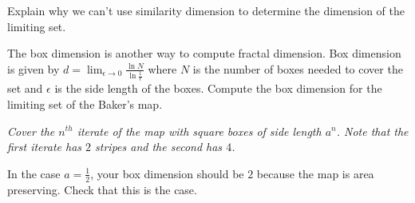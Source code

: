 \documentclass[12pt,letterpaper,noanswers]{exam}
\begin{document}
\begin{questions}
\begin{parts}
\item Explain why we can't use similarity dimension to determine the dimension of the limiting set.
\item The box dimension is another way to compute fractal dimension.  Box dimension is given by
$d = \lim_{\epsilon \rightarrow 0} \frac{\ln N}{\ln \frac{1}{\epsilon}}$ where $N$ is the number of boxes needed to cover the set and $\epsilon$
is the side length of the boxes.  Compute the box dimension for the limiting set of the Baker's map.

\emph{Cover the $n^{th}$ iterate of the map with square boxes
of side length $a^n$.  Note that the first iterate has $2$ stripes and the second has $4$.  }
\item In the case $a = \frac{1}{2}$, your box dimension should be $2$ because the map is area preserving.  Check that this is the case.

\end{parts}


\end{questions}
\end{document}

